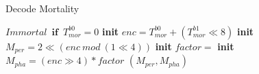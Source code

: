 \begin{algorithm}
\caption{Decode Mortality}
\begin{algorithmic}
    \Return $\textit{Immortal} \enspace \textbf{if} \enspace T^{b0}_{mor} = 0$
    \State \textbf{init} $enc = T^{b0}_{mor} + (T^{b1}_{mor} \ll 8)$
    \State \textbf{init} $M_{per} = 2 \ll (enc\ mod\ (1 \ll 4))$
    \State \textbf{init} $factor =$ 
    \State \textbf{init} $M_{pha} = (enc \gg 4) * factor$
    \Return $(M_{per}, M_{pha})$
\end{algorithmic}
\end{algorithm}